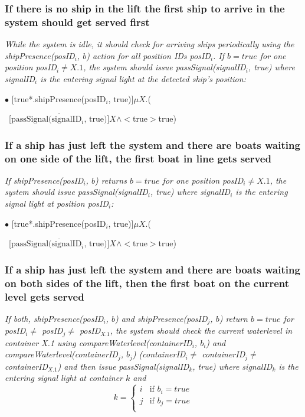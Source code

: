 \subsubsection{If there is no ship in the lift the first ship to arrive in the system should get served first}
\textit{While the system is idle, it should check for arriving ships periodically using the shipPresence(posID$_i$, $b$) action for all position IDs posID$_i$. If $b = true$ for one position posID$_i \neq X.1$, the system should issue passSignal(signalID$_i$, true) where signalID$_i$ is the entering signal light at the detected ship's position:}\vspace{0.3cm}

$ \bullet $ [true*.shipPresence(posID$_i$, true)]$ \mu X$.(
\begin{flushright}
	~[$ \overline{\textrm{passSignal(signalID$_i$, true)}} ]X \wedge <$true$>$true)
\end{flushright}

\subsubsection{If a ship has just left the system and there are boats waiting on one side of the lift, the first boat in line gets served}
\textit{If shipPresence(posID$_i$, $b$) returns $b = true$ for one position posID$_i \neq X.1$, the system should issue passSignal(signalID$_i$, true) where signalID$_i$ is the entering signal light at position posID$_i$:}\vspace{0.3cm}

$ \bullet $ [true*.shipPresence(posID$_i$, true)]$ \mu X$.(
\begin{flushright}
	~[$ \overline{\textrm{passSignal(signalID$_i$, true)}} ]X \wedge <$true$>$true)
\end{flushright}

\subsubsection{If a ship has just left the system and there are boats waiting on both sides of the lift, then the first boat on the current level gets served}
\textit{If both, shipPresence(posID$_i$, $b$) and shipPresence(posID$_j$, $b$) return $b = true$ for posID$_i \neq$ posID$_j \neq$ posID$_{X.1}$, the system should check the current waterlevel in container X.1 using compareWaterlevel(containerID$_i$, $b_i$) and \linebreak compareWaterlevel(containerID$_j$, $b_j$) (containerID$_i \neq$ containerID$_j \neq$ \linebreak containerID$_{X.1}$) and then issue passSignal(signalID$_k$, true) where signalID$_k$ is the entering signal light at container $k$ and
	\begin{equation*}
	k = 
	\begin{cases}
	i & \text{if } b_i = true\\
	j & \text{if } b_j = true\\
	\end{cases}
	\end{equation*}
}\vspace{0.3cm}

